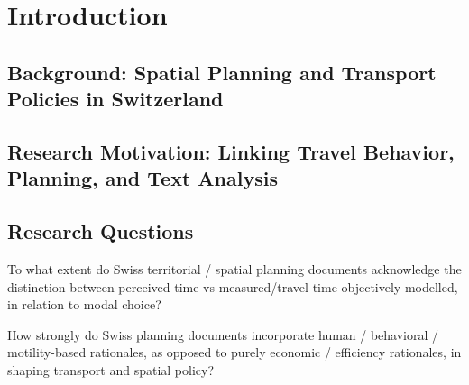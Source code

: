 \section{Introduction}

\subsection{Background: Spatial Planning and Transport Policies in Switzerland}

\subsection{Research Motivation: Linking Travel Behavior, Planning, and Text Analysis}


\subsection{Research Questions}

To what extent do Swiss territorial / spatial planning documents acknowledge the distinction between perceived time vs measured/travel-time objectively modelled, in relation to modal choice?

How strongly do Swiss planning documents incorporate human / behavioral / motility-based rationales, as opposed to purely economic / efficiency rationales, in shaping transport and spatial policy?
